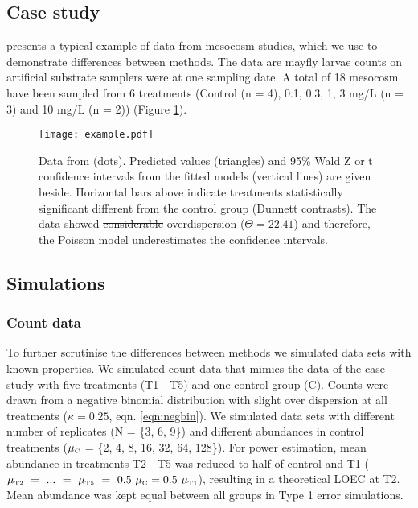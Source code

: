\documentclass[twocolumn, natbib]{svjour3}
\providecommand{\DIFadd}[1]{{\protect\color{blue}\uwave{#1}}} %
\providecommand{\DIFdel}[1]{{\protect\color{red}\sout{#1}}}                      %
\providecommand{\DIFdelbegin}{} %
\providecommand{\DIFaddFL}[1]{\DIFadd{#1}} %
\providecommand{\DIFdelFL}[1]{\DIFdel{#1}} %
\providecommand{\DIFaddbeginFL}{} %
\providecommand{\DIFaddendFL}{} %
\providecommand{\DIFdelbeginFL}{} %
\providecommand{\DIFdelendFL}{} %
\begin{document}
\subsection{Case study}
\citet{brock_minimum_2015} presents a typical example of data from mesocosm studies, which we use to demonstrate differences between methods.
The data are mayfly larvae counts on artificial substrate samplers were at one sampling date. 
A total of 18 mesocosm have been sampled from 6 treatments (Control (n = 4), 0.1, 0.3, 1, 3 mg/L (n = 3) and 10 mg/L (n = 2)) (Figure \ref{fig:example}).

\DIFdelbegin %
\DIFdelendFL \DIFaddbeginFL \begin{figure}[h]
  \DIFaddendFL \centering
  \texttt{[image: example.pdf]}
  \caption{Data from \citet{brock_minimum_2015} (dots). 
  Predicted values (triangles) and 95\% Wald Z or t confidence intervals from the fitted models (vertical lines) are given beside.
  Horizontal bars above indicate treatments statistically significant different from the control group (Dunnett contrasts).
  The data showed \DIFdelbeginFL \DIFdelFL{considerable }\DIFdelendFL \DIFaddbeginFL \DIFaddFL{slight }\DIFaddendFL overdispersion (\DIFdelbeginFL \DIFdelFL{$\Theta = 22.41$}\DIFdelendFL \DIFaddbeginFL \DIFaddFL{$\kappa = 0.26$}\DIFaddendFL ) and therefore, the Poisson model underestimates the \DIFaddbeginFL \DIFaddFL{width of }\DIFaddendFL confidence intervals.
  }
  \label{fig:example}
\end{figure}


\subsection{Simulations}
\subsubsection{Count data}
To further scrutinise the differences between methods we simulated data sets with known properties.
We simulated count data that mimics the data of the case study with five treatments (T1 - T5) and one control group (C).
Counts were drawn from a negative binomial distribution with slight over dispersion at all treatments ($\kappa = 0.25$, eqn. \ref{eqn:negbin}).
We simulated data sets with different number of replicates (N = \{3, 6, 9\}) and different abundances in control treatments ($\mu_\text{\tiny C}$ = \{2, 4, 8, 16, 32, 64, 128\}). 
For power estimation, mean abundance in treatments T2 - T5 was reduced to half of control and T1 ($\mu_\text{\tiny T2}~=~...~=~\mu_\text{\tiny T5}~=~0.5~\mu_\text{\tiny C} = 0.5~\mu_\text{\tiny T1}$), resulting in a theoretical LOEC at T2.
Mean abundance was kept equal between all groups in Type 1 error simulations.
\end{document}
